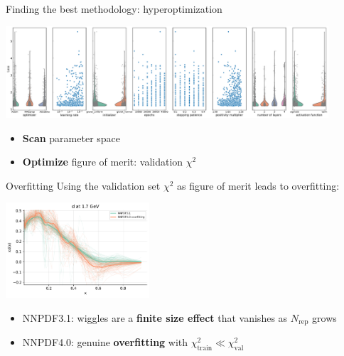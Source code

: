 \documentclass[aspectratio=169,10pt]{beamer}
\begin{document}
\begin{frame}{Finding the best methodology: hyperoptimization}

\begin{center}
\includegraphics[width=0.9\textwidth]{methodology/hyperopt_scan}
\end{center}
    \begin{itemize}
        \item \textbf{Scan} parameter space
        \item \textbf{Optimize} figure of merit: validation $\chi^2$
    \end{itemize}
\end{frame}



\begin{frame}{Overfitting}
Using the validation set $\chi^2$ as figure of merit leads to overfitting:
\begin{center}
\includegraphics[width=0.4\textwidth]{methodology/overfit_nnpdf31}
\end{center}
    \begin{itemize}
        \item NNPDF3.1: wiggles are a \textbf{finite size effect} that vanishes as $N_\mathrm{rep}$ grows
        \item NNPDF4.0: genuine \textbf{overfitting} with $\chi^2_\mathrm{train} \ll \chi^2_\mathrm{val}$
    \end{itemize}
\end{frame}
\end{document}
